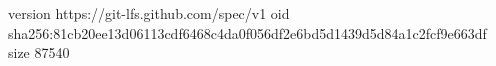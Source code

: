 version https://git-lfs.github.com/spec/v1
oid sha256:81cb20ee13d06113cdf6468c4da0f056df2e6bd5d1439d5d84a1c2fcf9e663df
size 87540
